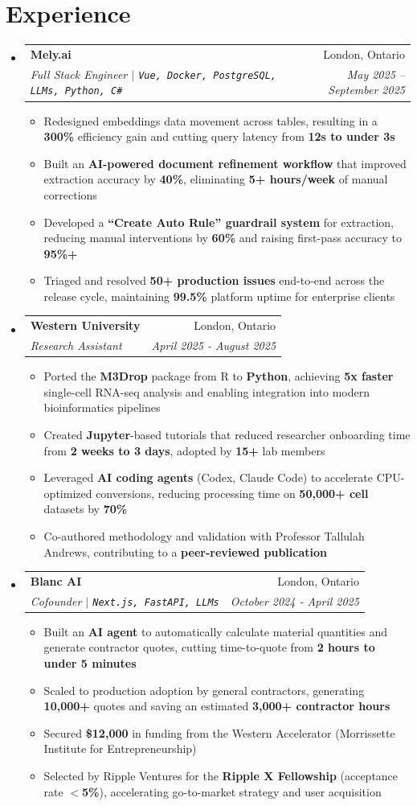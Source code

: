 \documentclass[letterpaper,10pt]{article}
\makeatletter
\newcommand{\resumeItem}[1]{
  \item\small{
    {#1 \vspace{-2pt}}
  }
}
\newcommand{\resumeSubheading}[4]{
  \vspace{-2pt}\item
    \begin{tabular*}{0.97\textwidth}[t]{l@{\extracolsep{\fill}}r}
      \textbf{#1} & #2 \\
      \textit{\small#3} & \textit{\small #4} \\
    \end{tabular*}\vspace{-7pt}
}
\newcommand{\resumeSubHeadingListStart}{\begin{itemize}[leftmargin=0.15in, label={}]}
\newcommand{\resumeSubHeadingListEnd}{\end{itemize}}
\newcommand{\resumeItemListStart}{\begin{itemize}}
\newcommand{\resumeItemListEnd}{\end{itemize}\vspace{-5pt}}
\makeatother
\begin{document}
\section{Experience}
\resumeSubHeadingListStart
  \resumeSubheading
    {Mely.ai}{London, Ontario}
    {Full Stack Engineer $|$ \textup{\texttt{Vue, Docker, PostgreSQL, LLMs, Python, C\#}}}{May 2025 -- September 2025}
    \resumeItemListStart
      \resumeItem{Redesigned embeddings data movement across tables, resulting in a \textbf{300\%} efficiency gain and cutting query latency from \textbf{12s to under 3s}}
      \resumeItem{Built an \textbf{AI-powered document refinement workflow} that improved extraction accuracy by \textbf{40\%}, eliminating \textbf{5+ hours/week} of manual corrections}
      \resumeItem{Developed a \textbf{``Create Auto Rule'' guardrail system} for extraction, reducing manual interventions by \textbf{60\%} and raising first-pass accuracy to \textbf{95\%+}}
      \resumeItem{Triaged and resolved \textbf{50+ production issues} end-to-end across the release cycle, maintaining \textbf{99.5\%} platform uptime for enterprise clients}
    \resumeItemListEnd
  \resumeSubheading
    {Western University}{London, Ontario}
    {Research Assistant}{April 2025 - August 2025}
    \resumeItemListStart
      \resumeItem{Ported the \textbf{M3Drop} package from R to \textbf{Python}, achieving \textbf{5x faster} single-cell RNA-seq analysis and enabling integration into modern bioinformatics pipelines}
      \resumeItem{Created \textbf{Jupyter}-based tutorials that reduced researcher onboarding time from \textbf{2 weeks to 3 days}, adopted by \textbf{15+} lab members}
      \resumeItem{Leveraged \textbf{AI coding agents} (Codex, Claude Code) to accelerate CPU-optimized conversions, reducing processing time on \textbf{50{,}000+ cell} datasets by \textbf{70\%}}
      \resumeItem{Co-authored methodology and validation with Professor Tallulah Andrews, contributing to a \textbf{peer-reviewed publication}}
    \resumeItemListEnd
  \resumeSubheading
    {Blanc AI}{London, Ontario}
    {Cofounder $|$ \textup{\texttt{Next.js, FastAPI, LLMs}}}{October 2024 - April 2025}
    \resumeItemListStart
      \resumeItem{Built an \textbf{AI agent} to automatically calculate material quantities and generate contractor quotes, cutting time-to-quote from \textbf{2 hours to under 5 minutes}}
      \resumeItem{Scaled to production adoption by general contractors, generating \textbf{10{,}000+} quotes and saving an estimated \textbf{3{,}000+ contractor hours}}
      \resumeItem{Secured \textbf{\$12{,}000} in funding from the Western Accelerator (Morrissette Institute for Entrepreneurship)}
      \resumeItem{Selected by Ripple Ventures for the \textbf{Ripple X Fellowship} (acceptance rate \textbf{$<$5\%}), accelerating go-to-market strategy and user acquisition}
    \resumeItemListEnd
\resumeSubHeadingListEnd
\end{document}
